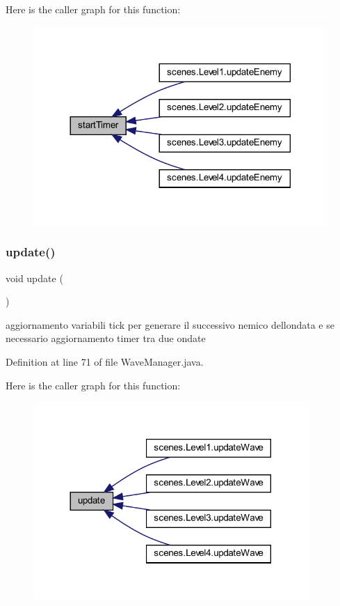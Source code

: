 Here is the caller graph for this function\+:\nopagebreak
\begin{figure}[H]
\begin{center}
\leavevmode
\includegraphics[width=317pt]{classmanagers_1_1_wave_manager_aec53975ffc59ffaf3080db21af0d2f6e_icgraph}
\end{center}
\end{figure}
\mbox{\label{classmanagers_1_1_wave_manager_ac5c54df7ed3b930268c8d7752c101725}} 
\subsubsection{\texorpdfstring{update()}{update()}}
{\footnotesize\ttfamily void update (\begin{DoxyParamCaption}{ }\end{DoxyParamCaption})}



aggiornamento variabili tick per generare il successivo nemico dell\textquotesingle{}ondata e se necessario aggiornamento timer tra due ondate 



Definition at line 71 of file Wave\+Manager.\+java.

Here is the caller graph for this function\+:\nopagebreak
\begin{figure}[H]
\begin{center}
\leavevmode
\includegraphics[width=296pt]{classmanagers_1_1_wave_manager_ac5c54df7ed3b930268c8d7752c101725_icgraph}
\end{center}
\end{figure}


